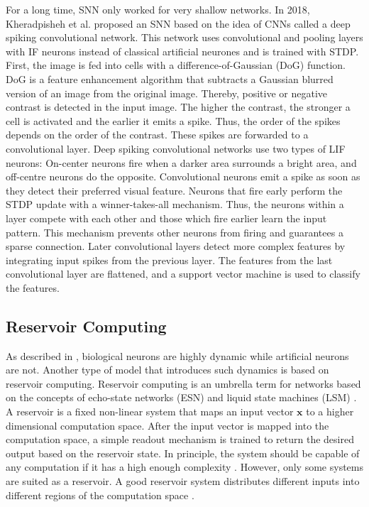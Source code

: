 For a long time, SNN only worked for very shallow networks.
In 2018, Kheradpisheh et al.  proposed an SNN based on the idea of CNNs called a deep spiking convolutional network.
This network uses convolutional and pooling layers with IF neurons instead of classical artificial neurones and is trained with STDP.
First, the image is fed into cells with a difference-of-Gaussian (DoG) function.
DoG is a feature enhancement algorithm that subtracts a Gaussian blurred version of an image from the original image.
Thereby, positive or negative contrast is detected in the input image.
The higher the contrast, the stronger a cell is activated and the earlier it emits a spike.
Thus, the order of the spikes depends on the order of the contrast.
These spikes are forwarded to a convolutional layer.
Deep spiking convolutional networks use two types of LIF neurons: On-center neurons fire when a darker area surrounds a bright area, and off-centre neurons do the opposite.
Convolutional neurons emit a spike as soon as they detect their preferred visual feature.
Neurons that fire early perform the STDP update with a winner-takes-all mechanism.
Thus, the neurons within a layer compete with each other and those which fire earlier learn the input pattern.
This mechanism prevents other neurons from firing and guarantees a sparse connection.
Later convolutional layers detect more complex features by integrating input spikes from the previous layer.
The features from the last convolutional layer are flattened, and a support vector machine is used to classify the features.

\subsection{Reservoir Computing}
As described in , biological neurons are highly dynamic while artificial neurons are not.
Another type of model that introduces such dynamics is based on reservoir computing.
Reservoir computing is an umbrella term for networks based on the concepts of echo-state networks (ESN)  and liquid state machines (LSM) .
A reservoir is a fixed non-linear system that maps an input vector \(\boldsymbol{x}\) to a higher dimensional computation space.
After the input vector is mapped into the computation space, a simple readout mechanism is trained to return the desired output based on the reservoir state.
In principle, the system should be capable of any computation if it has a high enough complexity .
However, only some systems are suited as a reservoir.
A good reservoir system distributes different inputs into different regions of the computation space \cite{Konkoli_2018}.

